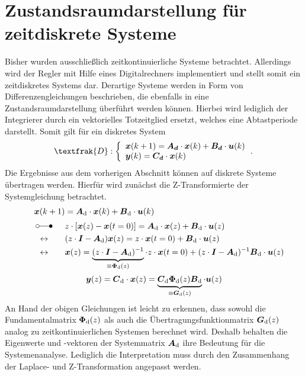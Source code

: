\section{Zustandsraumdarstellung für zeitdiskrete Systeme}
Bisher wurden ausschließlich zeitkontinuierliche Systeme betrachtet. Allerdings wird der Regler mit Hilfe eines Digitalrechners implementiert und stellt somit ein zeitdiskretes Systems dar. Derartige Systeme werden in Form von Differenzengleichungen beschrieben, die ebenfalls in eine Zustandsraumdarstellung überführt werden können. Hierbei wird lediglich der Integrierer durch ein vektorielles Totzeitglied ersetzt, welches eine Abtastperiode darstellt. Somit gilt für ein diskretes System 
\begin{equation}
\textfrak{D} : \left\{ \begin{array}{ll}
\bs{{x}}(k+1) = \bs{A_d}\cdot \bs{x}(k) + \bs{B_d}\cdot \bs{u}(k) \\
\bs{y}(k) = \bs{C_d}\cdot \bs{x}(k)
\end{array}\,.
\right.
\label{eq_discrete_ss}
\end{equation}
Die Ergebnisse aus dem vorherigen Abschnitt können auf diskrete Systeme übertragen werden. Hierfür wird zunächst die Z-Transformierte der Systemgleichung betrachtet.
\begin{align}
\bs{x}(k+1) &= \bs{A}\idx{d}\cdot \bs{x}(k)+\bs{B}\idx{d}\cdot \bs{u}(k)
\nonumber
\\ \myLaplace  &z\cdot \left[\bs{x}(z)- \bs{x}(t=0)\right] = \bs{A}\idx{d}\cdot \bs{x}(z) + \bs{B}\idx{d}\cdot \bs{u}(z) \nonumber
\\
\hspace{15pt}\leftrightarrow\hspace{20pt}
&(z\cdot\bs{I}-\bs{A}\idx{d})\bs{x}(z) = z\cdot \bs{x}(t=0)+\bs{B}\idx{d}\cdot \bs{u}(z) \nonumber
\\
\hspace{15pt}\leftrightarrow\hspace{20pt}
&\bs{x}(z) = \underbrace{(z\cdot\bs{I}-\bs{A}\idx{d})^{-1}}_{\equiv \bs{\Phi}\idx{d}(z)}\cdot z\cdot \bs{x}(t=0) + (z\cdot \bs{I}-\bs{A}\idx{d})^{-1}\bs{B}\idx{d}\cdot \bs{u}(z)
\end{align}
\begin{equation}
\boldsymbol{y}(z) = \boldsymbol{C}_{\text{d}}\cdot \boldsymbol{x}(z) = \underbrace{\boldsymbol{C}_{\text{d}}\boldsymbol{\Phi}_{\text{d}}(z)\boldsymbol{B}_{\text{d}}}_{\equiv \boldsymbol{G}_{\text{d}}(z)}\cdot \boldsymbol{u}(z)
\end{equation}
An Hand der obigen Gleichungen ist leicht zu erkennen, dass sowohl die Fundamentalmatrix $\boldsymbol{\Phi}_{\text{d}}(z)$ als auch die Übertragungsfunktionmatrix $\boldsymbol{G}_{\text{d}}(z)$ analog zu zeitkontinuierlichen Systemen berechnet wird. Deshalb behalten die Eigenwerte und -vektoren der Systemmatrix $\boldsymbol{A}_{\text{d}}$ ihre Bedeutung für die Systemenanalyse. Lediglich die Interpretation muss durch den Zusammenhang der Laplace- und Z-Transformation angepasst werden.
